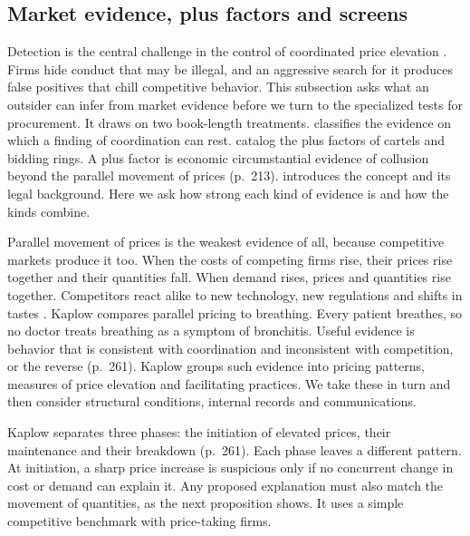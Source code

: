 \subsection{Market evidence, plus factors and screens}\label{sec:13-market-evidence}

Detection is the central challenge in the control of coordinated price elevation \citep[p.~256]{Kaplow2013}. Firms
hide conduct that may be illegal, and an aggressive search for it produces false positives that chill competitive
behavior. This subsection asks what an outsider can infer from market evidence before we turn to the specialized
tests for procurement. It draws on two book-length treatments. \citet[chs.~10--11]{Kaplow2013} classifies the
evidence on which a finding of coordination can rest. \citet[chs.~11--12]{MarshallMarx2012} catalog the
plus factors of cartels and bidding rings. A plus factor is economic circumstantial evidence of collusion
beyond the parallel movement of prices (p.~213).  introduces the concept and its legal
background. Here we ask how strong each kind of evidence is and how the kinds combine.

Parallel movement of prices is the weakest evidence of all, because competitive markets produce it too. When the
costs of competing firms rise, their prices rise together and their quantities fall. When demand rises, prices and
quantities rise together. Competitors react alike to new technology, new regulations and shifts in tastes
\citep[p.~260]{Kaplow2013}. Kaplow compares parallel pricing to breathing. Every patient breathes, so no doctor
treats breathing as a symptom of bronchitis. Useful evidence is behavior that is consistent with coordination and
inconsistent with competition, or the reverse (p.~261). Kaplow groups such evidence into pricing patterns, measures
of price elevation and facilitating practices. We take these in turn and then consider structural conditions,
internal records and communications.

Kaplow separates three phases: the initiation of elevated prices, their maintenance and their breakdown (p.~261).
Each phase leaves a different pattern. At initiation, a sharp price increase is suspicious only if no concurrent
change in cost or demand can explain it. Any proposed explanation must also match the movement of quantities, as
the next proposition shows. It uses a simple competitive benchmark with price-taking firms.


